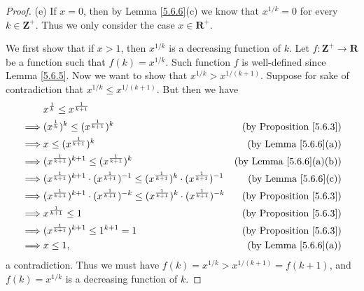 \begin{proof}{(e)}
    If \(x = 0\), then by Lemma \ref{5.6.6}(c) we know that \(x^{1 / k} = 0\) for every \(k \in \mathbf{Z}^+\).
    Thus we only consider the case \(x \in \mathbf{R}^+\).

    We first show that if \(x > 1\), then \(x^{1 / k}\) is a decreasing function of \(k\).
    Let \(f : \mathbf{Z}^+ \to \mathbf{R}\) be a function such that \(f(k) = x^{1 / k}\).
    Such function \(f\) is well-defined since Lemma \ref{5.6.5}.
    Now we want to show that \(x^{1 / k} > x^{1 / (k + 1)}\).
    Suppose for sake of contradiction that \(x^{1 / k} \leq x^{1 / (k + 1)}\).
    But then we have
    \begin{align*}
                 & x^{\frac{1}{k}} \leq x^{\frac{1}{k + 1}}                                                                                                                           \\
        \implies & (x^{\frac{1}{k}})^k \leq (x^{\frac{1}{k + 1}})^k                                                                             & \text{(by Proposition \ref{5.6.3})} \\
        \implies & x \leq (x^{\frac{1}{k + 1}})^k                                                                                               & \text{(by Lemma \ref{5.6.6}(a))}    \\
        \implies & (x^{\frac{1}{k + 1}})^{k + 1} \leq (x^{\frac{1}{k + 1}})^k                                                                   & \text{(by Lemma \ref{5.6.6}(a)(b))} \\
        \implies & (x^{\frac{1}{k + 1}})^{k + 1} \cdot (x^{\frac{1}{k + 1}})^{-1} \leq (x^{\frac{1}{k + 1}})^k \cdot (x^{\frac{1}{k + 1}})^{-1} & \text{(by Lemma \ref{5.6.6}(c))}    \\
        \implies & (x^{\frac{1}{k + 1}})^{k + 1} \cdot (x^{\frac{1}{k + 1}})^{-k} \leq (x^{\frac{1}{k + 1}})^k \cdot (x^{\frac{1}{k + 1}})^{-k} & \text{(by Proposition \ref{5.6.3})} \\
        \implies & x^{\frac{1}{k + 1}} \leq 1                                                                                                   & \text{(by Proposition \ref{5.6.3})} \\
        \implies & (x^{\frac{1}{k + 1}})^{k + 1} \leq 1^{k + 1} = 1                                                                             & \text{(by Proposition \ref{5.6.3})} \\
        \implies & x \leq 1,                                                                                                                    & \text{(by Lemma \ref{5.6.6}(a))}
    \end{align*}
    a contradiction.
    Thus we must have \(f(k) = x^{1 / k} > x^{1 / (k + 1)} = f(k + 1)\), and \(f(k) = x^{1 / k}\) is a decreasing function of \(k\).


\end{proof}
